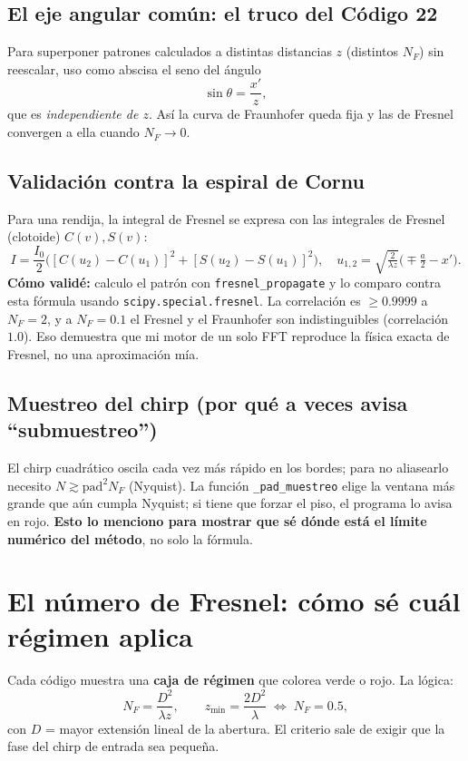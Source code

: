 \documentclass[11pt,a4paper]{article}
\begin{document}
\subsection{El eje angular común: el truco del Código 22}
Para superponer patrones calculados a distintas distancias $z$ (distintos $N_F$)
sin reescalar, uso como abscisa el seno del ángulo
\[
\sin\theta=\frac{x'}{z},
\]
que es \emph{independiente de $z$}. Así la curva de Fraunhofer queda fija y las de
Fresnel convergen a ella cuando $N_F\to0$.

\subsection{Validación contra la espiral de Cornu}
Para una rendija, la integral de Fresnel se expresa con las integrales de Fresnel
(clotoide) $C(v),S(v)$:
\[
I=\frac{I_0}{2}\Big([C(u_2)-C(u_1)]^2+[S(u_2)-S(u_1)]^2\Big),\quad
u_{1,2}=\sqrt{\tfrac{2}{\lambda z}}\Big(\mp\tfrac{a}{2}-x'\Big).
\]
\textbf{Cómo validé:} calculo el patrón con \texttt{fresnel\_propagate} y lo comparo
contra esta fórmula usando \texttt{scipy.special.fresnel}. La correlación es
$\ge0.9999$ a $N_F=2$, y a $N_F=0.1$ el Fresnel y el Fraunhofer son
indistinguibles (correlación $1.0$). Eso demuestra que mi motor de un solo FFT
reproduce la física exacta de Fresnel, no una aproximación mía.

\subsection{Muestreo del chirp (por qué a veces avisa ``submuestreo'')}
El chirp cuadrático oscila cada vez más rápido en los bordes; para no aliasearlo
necesito $N\gtrsim\text{pad}^2N_F$ (Nyquist). La función \texttt{\_pad\_muestreo}
elige la ventana más grande que aún cumpla Nyquist; si tiene que forzar el piso,
el programa lo avisa en rojo. \textbf{Esto lo menciono para mostrar que sé dónde
está el límite numérico del método}, no solo la fórmula.

\section{El número de Fresnel: cómo sé cuál régimen aplica}
\label{sec:regimen}

Cada código muestra una \textbf{caja de régimen} que colorea verde o rojo. La lógica:
\begin{equation}
N_F=\frac{D^2}{\lambda z},\qquad
z_\text{min}=\frac{2D^2}{\lambda}\;\Longleftrightarrow\; N_F=0.5,
\end{equation}
con $D$ = mayor extensión lineal de la abertura. El criterio sale de exigir que la
fase del chirp de entrada sea pequeña.
\end{document}
